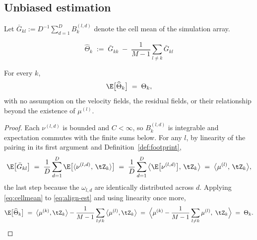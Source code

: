 \subsection{Unbiased estimation}
\label{sec:align-estimator}

Let $\bar{G}_{kl} := D^{-1}\sum_{d=1}^{D} B_k^{(l,d)}$ denote the cell mean of the simulation
array.

\begin{definition}
\label{def:align-est}
\begin{equation}
  \label{eq:align-est}
  \boxed{\;\widehat{\Theta}_k \;:=\; \bar{G}_{kk} \;-\; \frac{1}{M-1}\sum_{l \neq k} \bar{G}_{kl}\;}
\end{equation}
\end{definition}

\begin{proposition}
\label{prop:unbiased}
For every $k$,
\begin{equation}
  \E\big[\widehat{\Theta}_k\big] \;=\; \Theta_k ,
\end{equation}
with no assumption on the velocity fields, the residual fields, or their relationship beyond the
existence of $\mu^{(l)}$.
\end{proposition}

\begin{proof}
Each $\nu^{(l,d)}$ is bounded and $C < \infty$, so $B_k^{(l,d)}$ is integrable and expectation
commutes with the finite sums below. For any $l$, by linearity of the pairing in its first
argument and Definition~\ref{def:footprint},
\begin{equation}
  \label{eq:cellmean}
  \E\big[\bar{G}_{kl}\big]
  \;=\; \frac{1}{D}\sum_{d=1}^{D} \E\big[\langle \nu^{(l,d)},\, \tZ_k\rangle\big]
  \;=\; \frac{1}{D}\sum_{d=1}^{D} \big\langle \E\big[\nu^{(l,d)}\big],\, \tZ_k\big\rangle
  \;=\; \big\langle \mu^{(l)},\, \tZ_k \big\rangle ,
\end{equation}
the last step because the $\omega_{l,d}$ are identically distributed across $d$. Applying
\eqref{eq:cellmean} to \eqref{eq:align-est} and using linearity once more,
\begin{equation}
  \E\big[\widehat{\Theta}_k\big]
  \;=\; \big\langle \mu^{(k)}, \tZ_k\big\rangle - \frac{1}{M-1}\sum_{l\neq k}\big\langle \mu^{(l)}, \tZ_k\big\rangle
  \;=\; \Big\langle \mu^{(k)} - \frac{1}{M-1}\sum_{l\neq k} \mu^{(l)},\;\tZ_k\Big\rangle
  \;=\; \Theta_k . \qedhere
\end{equation}
\end{proof}

